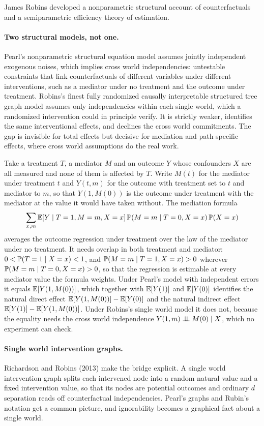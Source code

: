 James Robins developed a nonparametric structural account of counterfactuals and a semiparametric efficiency theory of estimation.

\paragraph{Two structural models, not one.} Pearl's nonparametric structural equation model assumes jointly independent exogenous noises, which implies cross world independencies: untestable constraints that link counterfactuals of different variables under different interventions, such as a mediator under no treatment and the outcome under treatment. Robins's finest fully randomized causally interpretable structured tree graph model assumes only independencies within each single world, which a randomized intervention could in principle verify. It is strictly weaker, identifies the same interventional effects, and declines the cross world commitments. The gap is invisible for total effects but decisive for mediation and path specific effects, where cross world assumptions do the real work.

Take a treatment $T$, a mediator $M$ and an outcome $Y$ whose confounders $X$ are all measured and none of them is affected by $T$. Write $M(t)$ for the mediator under treatment $t$ and $Y(t,m)$ for the outcome with treatment set to $t$ and mediator to $m$, so that $Y(1,M(0))$ is the outcome under treatment with the mediator at the value it would have taken without. The mediation formula
\[
\sum_{x,m}\mathbb{E}[Y\mid T=1,M=m,X=x]\,\mathbb{P}(M=m\mid T=0,X=x)\,\mathbb{P}(X=x)
\]
averages the outcome regression under treatment over the law of the mediator under no treatment. It needs overlap in both treatment and mediator: $0<\mathbb{P}(T=1\mid X=x)<1$, and $\mathbb{P}(M=m\mid T=1,X=x)>0$ wherever $\mathbb{P}(M=m\mid T=0,X=x)>0$, so that the regression is estimable at every mediator value the formula weights. Under Pearl's model with independent errors it equals $\mathbb{E}[Y(1,M(0))]$, which together with $\mathbb{E}[Y(1)]$ and $\mathbb{E}[Y(0)]$ identifies the natural direct effect $\mathbb{E}[Y(1,M(0))]-\mathbb{E}[Y(0)]$ and the natural indirect effect $\mathbb{E}[Y(1)]-\mathbb{E}[Y(1,M(0))]$. Under Robins's single world model it does not, because the equality needs the cross world independence $Y(1,m)\perp\!\!\!\perp M(0)\mid X$, which no experiment can check.

\paragraph{Single world intervention graphs.} Richardson and Robins (2013) make the bridge explicit. A single world intervention graph splits each intervened node into a random natural value and a fixed intervention value, so that its nodes are potential outcomes and ordinary $d$ separation reads off counterfactual independencies. Pearl's graphs and Rubin's notation get a common picture, and ignorability becomes a graphical fact about a single world.

